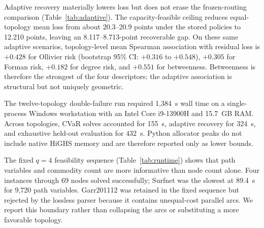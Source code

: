 \documentclass[preprint,12pt]{elsarticle}
\begin{document}


Adaptive recovery materially lowers loss but does not erase the frozen-routing
comparison (Table~\ref{tab:adaptive}). The capacity-feasible ceiling reduces
equal-topology mean loss from about 20.3--20.9 points under the stored policies
to 12.210 points, leaving an 8.117--8.713-point recoverable gap. On these same
adaptive scenarios, topology-level mean Spearman association with residual
loss is $+0.428$ for Ollivier risk (bootstrap 95\% CI: $+0.316$ to $+0.548$),
$+0.305$ for Forman risk, $+0.182$ for degree risk, and $+0.551$ for
betweenness. Betweenness is therefore the strongest of the four descriptors;
the adaptive association is structural but not uniquely geometric.



The twelve-topology double-failure run required 1,384~s wall time on a
single-process Windows workstation with an Intel Core i9-13900H and 15.7~GB
RAM. Across topologies, CVaR solves accounted for 155~s, adaptive recovery for
324~s, and exhaustive held-out evaluation for 432~s. Python allocator peaks do
not include native HiGHS memory and are therefore reported only as lower bounds.

The fixed $q=4$ feasibility sequence (Table~\ref{tab:runtime}) shows that path
variables and commodity count are more informative than node count alone. Four
instances through 69 nodes solved successfully; Surfnet was the slowest at
89.4~s for 9,720 path variables. Garr201112 was retained in the fixed sequence
but rejected by the lossless parser because it contains unequal-cost parallel
arcs. We report this boundary rather than collapsing the arcs or substituting a
more favorable topology.

\begin{table}[t]
\centering
\caption{Fixed scalability sequence, matrix 0000 and $q=4$. Total includes
parsing, paths, ORC, tuning, and four final policies. Python peak excludes
native solver allocations.}
\label{tab:runtime}
\small
{}
\end{table}
\end{document}
